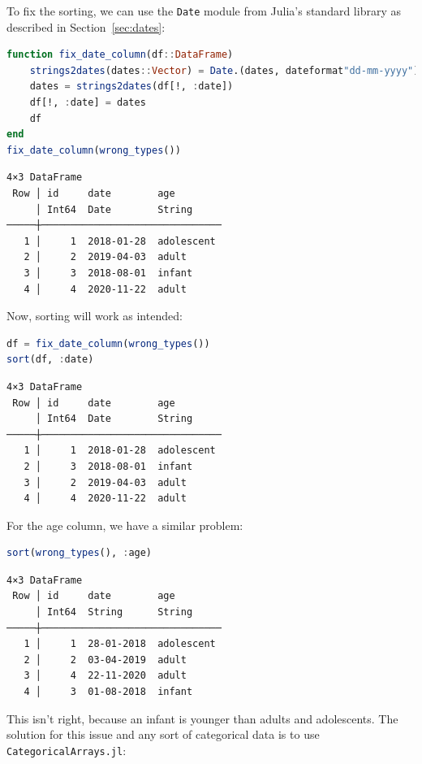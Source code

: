 \documentclass[
  notoc %
]{tufte-book}
\newcommand{\passthrough}[1]{#1}
\begin{document}
To fix the sorting, we can use the \passthrough{\lstinline!Date!} module
from Julia's standard library as described in Section~\ref{sec:dates}:

\begin{lstlisting}[language=Julia]
function fix_date_column(df::DataFrame)
    strings2dates(dates::Vector) = Date.(dates, dateformat"dd-mm-yyyy")
    dates = strings2dates(df[!, :date])
    df[!, :date] = dates
    df
end
fix_date_column(wrong_types())
\end{lstlisting}

\begin{lstlisting}[language=Output]
4×3 DataFrame
 Row │ id     date        age
     │ Int64  Date        String
─────┼───────────────────────────────
   1 │     1  2018-01-28  adolescent
   2 │     2  2019-04-03  adult
   3 │     3  2018-08-01  infant
   4 │     4  2020-11-22  adult
\end{lstlisting}

Now, sorting will work as intended:

\begin{lstlisting}[language=Julia]
df = fix_date_column(wrong_types())
sort(df, :date)
\end{lstlisting}

\begin{lstlisting}[language=Output]
4×3 DataFrame
 Row │ id     date        age
     │ Int64  Date        String
─────┼───────────────────────────────
   1 │     1  2018-01-28  adolescent
   2 │     3  2018-08-01  infant
   3 │     2  2019-04-03  adult
   4 │     4  2020-11-22  adult
\end{lstlisting}

For the age column, we have a similar problem:

\begin{lstlisting}[language=Julia]
sort(wrong_types(), :age)
\end{lstlisting}

\begin{lstlisting}[language=Output]
4×3 DataFrame
 Row │ id     date        age
     │ Int64  String      String
─────┼───────────────────────────────
   1 │     1  28-01-2018  adolescent
   2 │     2  03-04-2019  adult
   3 │     4  22-11-2020  adult
   4 │     3  01-08-2018  infant
\end{lstlisting}

This isn't right, because an infant is younger than adults and
adolescents. The solution for this issue and any sort of categorical
data is to use \passthrough{\lstinline!CategoricalArrays.jl!}:
\end{document}
